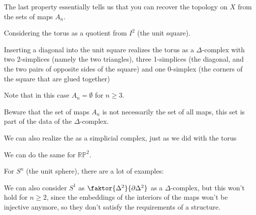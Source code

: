 \begin{oral}
    The last property essentially tells us that you can recover the topology on $X$ from the sets of maps $A_n$.
\end{oral}

\begin{example}
    Considering the torus as a quotient from $I^2$ (the unit square).


    Inserting a diagonal into the unit square realizes the torus as a $\Delta$-complex with two 2-simplices (namely the two triangles), three 1-simplices (the diagonal, and the two pairs of opposite sides of the square) and one 0-simplex (the corners of the square that are glued together)

    Note that in this case $A_n = \emptyset$ for $n\geq 3$.
\end{example}



\begin{oral}
    Beware that the set of maps $A_n$ is not necessarily the set of all maps, this set is part of the data of the $\Delta$-complex.
\end{oral}


\begin{example*}\label{ex:klein-bottle-delta-complex}
    We can also realize the  as a simplicial complex, just as we did with the torus
\end{example*}

\begin{example*}
    We can do the same for $\mathbb{R}\mathbb{P}^2$.
\end{example*}

\begin{example*}
    For $S^n$ (the unit sphere), there are a lot of examples:

   
    We can also consider $S^1$ as  $\faktor{\Delta^2}{\partial\Delta^2}$ as a $\Delta$-complex, but this won't hold for $n\geq 2$, since the embeddings of the interiors of the maps won't be injective anymore, so they don't satisfy the requirements of a structure.
\end{example*}

